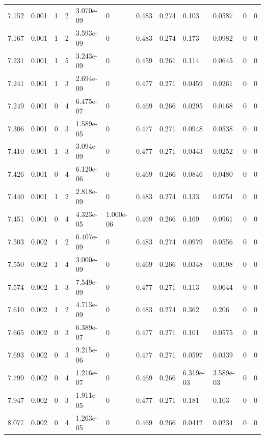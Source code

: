 \documentclass[preview]{standalone}
\begin{document}
{{{\begin{tabular}{L{1.2cm}C{1.2cm} C{0.3cm}C{0.5cm} C{1.4cm}C{1.4cm} C{1.4cm}C{1.4cm} C{1.6cm}C{1.6cm} C{1.6cm}C{1.6cm}}
  7.152  &  0.001  & 1     &  2 &  3.070e-09  & 0  &  0.483&   0.274& 0.103 & 0.0587   &  0 & 0  \\ 
  7.167  &  0.001  & 1     &  2 &  3.593e-09  & 0  &  0.483&   0.274& 0.173 & 0.0982   &  0 & 0  \\ 
  7.231  &  0.001  & 1     &  5 &  3.243e-09  & 0  &  0.459&   0.261& 0.114 & 0.0645   &  0 & 0  \\ 
  7.241  &  0.001  & 1     &  3 &  2.694e-09  & 0  &  0.477&   0.271& 0.0459 & 0.0261   &  0 & 0  \\ 
  7.249  &  0.001  & 0     &  4 &  6.475e-07  & 0  &  0.469&   0.266& 0.0295 & 0.0168   &  0 & 0  \\ 
  7.306  &  0.001  & 0     &  3 &  1.589e-05  & 0  &  0.477&   0.271& 0.0948 & 0.0538   &  0 & 0  \\ 
  7.410  &  0.001  & 1     &  3 &  3.094e-09  & 0  &  0.477&   0.271& 0.0443 & 0.0252   &  0 & 0  \\ 
  7.426  &  0.001  & 0     &  4 &  6.120e-06  & 0  &  0.469&   0.266& 0.0846 & 0.0480   &  0 & 0  \\ 
  7.440  &  0.001  & 1     &  2 &  2.818e-09  & 0  &  0.483&   0.274& 0.133 & 0.0754   &  0 & 0  \\ 
  7.451  &  0.001  & 0     &  4 &  4.323e-05  & 1.000e-06  &  0.469&   0.266& 0.169 & 0.0961   &  0 & 0  \\ 
  7.503  &  0.002  & 1     &  2 &  6.407e-09  & 0  &  0.483&   0.274& 0.0979 & 0.0556   &  0 & 0  \\ 
  7.550  &  0.002  & 1     &  4 &  3.000e-09  & 0  &  0.469&   0.266& 0.0348 & 0.0198   &  0 & 0  \\ 
  7.574  &  0.002  & 1     &  3 &  7.549e-09  & 0  &  0.477&   0.271& 0.113 & 0.0644   &  0 & 0  \\ 
  7.610  &  0.002  & 1     &  2 &  4.713e-09  & 0  &  0.483&   0.274& 0.362 & 0.206   &  0 & 0  \\ 
  7.665  &  0.002  & 0     &  3 &  6.389e-07  & 0  &  0.477&   0.271& 0.101 & 0.0575   &  0 & 0  \\ 
  7.693  &  0.002  & 0     &  3 &  9.215e-06  & 0  &  0.477&   0.271& 0.0597 & 0.0339   &  0 & 0  \\ 
  7.799  &  0.002  & 0     &  4 &  1.216e-07  & 0  &  0.469&   0.266& 6.319e-03 & 3.589e-03   &  0 & 0  \\ 
  7.947  &  0.002  & 0     &  3 &  1.911e-05  & 0  &  0.477&   0.271& 0.181 & 0.103   &  0 & 0  \\ 
  8.077  &  0.002  & 0     &  4 &  1.263e-05  & 0  &  0.469&   0.266& 0.0412 & 0.0234   &  0 & 0  \\ 

\end{tabular}}}}
\end{document}
